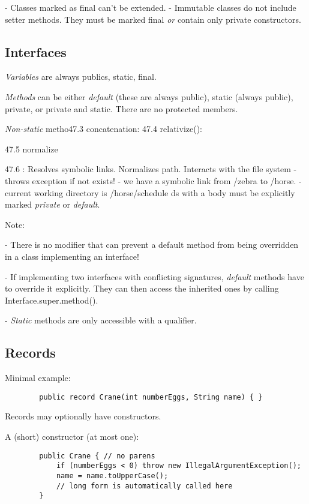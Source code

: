 \documentclass{scrartcl}
\begin{document}
    - Classes marked as final can’t be extended.
    - Immutable classes do not include setter methods. They must be marked final \textit{or} contain only private constructors.

\subsection{Interfaces}

    \textit{Variables} are always publics, static, final.

    \textit{Methods} can be either \textit{default} (these are always public), static (always public), private, or private and static. There are no protected members.

    \textit{Non-­static} metho47.3 concatenation:
    47.4 relativize():

    47.5 normalize

    47.6 : Resolves symbolic links. Normalizes path. Interacts with the file system - throws exception if not exists!
    - we have a symbolic link from /zebra to /horse.
    - current working directory is /horse/schedule
    ds with a body must be explicitly marked \textit{private} or \textit{default}.

    Note:

    - There is no modifier that can prevent a default method from being overridden in a class implementing an interface!

    - If implementing two interfaces with conflicting signatures, \textit{default} methods have to override it explicitly. They  can then access the inherited ones by calling Interface.super.method().

    - \textit{Static} methods are only accessible with a qualifier.

\subsection{Records}

    Minimal example:

    \begin{lstlisting}
        public record Crane(int numberEggs, String name) { }
    \end{lstlisting}

    Records may optionally have constructors.

    A (short) constructor (at most one):

    \begin{lstlisting}
        public Crane { // no parens
            if (numberEggs < 0) throw new IllegalArgumentException();
            name = name.toUpperCase();
            // long form is automatically called here
        }
    \end{lstlisting}
\end{document}

